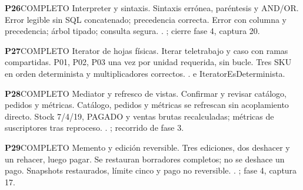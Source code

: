 \par\medskip\noindent\begin{minipage}{\linewidth}
\noindent\textbf{\large P26}\quad\textsf{COMPLETO}
 Interpreter y sintaxis.
 Sintaxis errónea, paréntesis y AND/OR.
 Error legible sin SQL concatenado; precedencia correcta.
 Error con columna y precedencia; árbol tipado; consulta segura.
 . ; cierre fase 4, captura 20.
\end{minipage}\par
\par\medskip\noindent\begin{minipage}{\linewidth}
\noindent\textbf{\large P27}\quad\textsf{COMPLETO}
 Iterator de hojas físicas.
 Iterar teletrabajo y caso con ramas compartidas.
 P01, P02, P03 una vez por unidad requerida, sin bucle.
 Tres SKU en orden determinista y multiplicadores correctos.
 .  e IteratorEsDeterminista.
\end{minipage}\par
\par\medskip\noindent\begin{minipage}{\linewidth}
\noindent\textbf{\large P28}\quad\textsf{COMPLETO}
 Mediator y refresco de vistas.
 Confirmar y revisar catálogo, pedidos y métricas.
 Catálogo, pedidos y métricas se refrescan sin acoplamiento directo.
 Stock 7/4/19, PAGADO y ventas brutas recalculadas; métricas de suscriptores tras reproceso.
 . ; recorrido de fase 3.
\end{minipage}\par
\par\medskip\noindent\begin{minipage}{\linewidth}
\noindent\textbf{\large P29}\quad\textsf{COMPLETO}
 Memento y edición reversible.
 Tres ediciones, dos deshacer y un rehacer, luego pagar.
 Se restauran borradores completos; no se deshace un pago.
 Snapshots restaurados, límite cinco y pago no reversible.
 . ; fase 4, captura 17.
\end{minipage}\par
